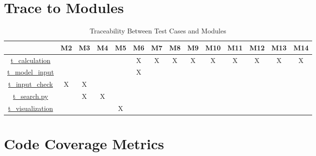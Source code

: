 \documentclass[12pt, titlepage]{article}
\begin{document}
\section{Trace to Modules}		
\begin{table}[h]
\centering
\begin{tabular}{|c|c|c|c|c|c|c|c|c|c|c|c|c|c|}
\hline
	& M2 & M3 & M4  & M5 & M6 & M7 & M8 & M9 & M10 & M11 & M12 & M13 & M14 \\
\hline

\href{https://github.com/CynthiaLiu0805/BridgeCorrosion/blob/main/src/database/test_calculation.py}{t\_calculation}    & &  &  &  & X & X & X & X & X & X & X & X & X \\ \hline
\href{https://github.com/CynthiaLiu0805/BridgeCorrosion/blob/main/src/database/test_model_check.py}{t\_model\_input} & &  &  &  & X &  & &  &  &  &  &  & \\ \hline
\href{https://github.com/CynthiaLiu0805/BridgeCorrosion/blob/main/src/app/test_input_check.py}{t\_input\_check} & X & X &  &  &  &  & &  &  &  &  &  & \\ \hline
\href{https://github.com/CynthiaLiu0805/BridgeCorrosion/blob/main/src/app/test_search.py}{t\_search.py} & & X & X &  &  &  & &  &  &  &  &  & \\ \hline
\href{https://github.com/CynthiaLiu0805/BridgeCorrosion/blob/main/src/app/test_visualization.py}{t\_visualization} & &  &  & X &  &  & &  &  &  &  &  & \\ \hline

\end{tabular}
\caption{Traceability Between Test Cases and Modules}
\label{Table:test_modules}
\end{table}
\section{Code Coverage Metrics}




\newpage{}
\end{document}
